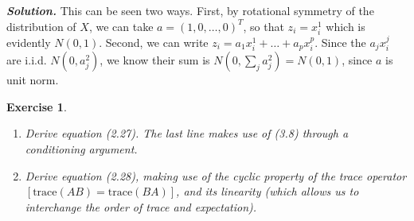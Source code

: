 \documentclass[12pt]{article}
\def\Trace{\text{trace}}
\newtheorem{exercise}{Exercise}[section]
\newenvironment{solution}[1][\it{Solution}]{\textbf{#1. } }{\vspace{.5cm}}
\begin{document}
\begin{solution}
 This can be seen two ways. First, by rotational symmetry of the distribution of $X$, we can take $a = (1, 0, \dots, 0)^T$, so that $z_i = x_i^1$ which is evidently $N(0,1)$. Second, we can write $z_i = a_1 x_i^1 + \dots + a_p x_i^p$. Since the $a_j x_i^j$ are i.i.d. $N(0,a_j^2)$, we know their sum is $N(0, \sum_j a_j^2) = N(0,1)$, since $a$ is unit norm.
\end{solution}


\begin{exercise}
\begin{enumerate}
\item[(a)] Derive equation (2.27). The last line makes use of (3.8) through a conditioning argument.

\item[(b)] Derive equation (2.28), making use of the \textit{cyclic} property of the trace operator $[\Trace(AB) = \Trace(BA)]$, and its linearity (which allows us to interchange the order of trace and expectation).
\end{enumerate}
\end{exercise}
\end{document}

